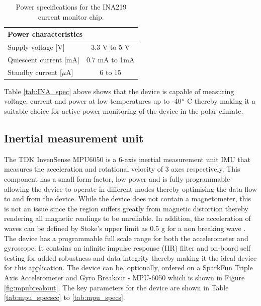 \begin{table}[H]
	\centering
	\caption{Power specifications for the INA219 current monitor chip.}
	\setlength{\extrarowheight}{5pt}
	\begin{tabular}{l c}
		\hline
		\multicolumn{2}{l}{\textbf{Power characteristics}}\\
		\hline
		\hline
		Supply voltage [V]  & 3.3 V to 5 V\\
		\hline
		Quiescent current [mA]  & 0.7 mA to 1mA\\
		\hline
		Standby current [$\mu$A] &6 to 15\\
		\hline
		\hline
	\end{tabular}
	
	\label{tab:INA_specpwr}
\end{table}

Table \ref{tab:INA_spec} above shows that the device is capable of measuring voltage, current and power at low temperatures up to -40$\degree$ C thereby making it a suitable choice for active power monitoring of the device in the polar climate.

\subsection{Inertial measurement unit}

The TDK InvenSense MPU6050\cite{mpu6050} is a 6-axis inertial measurement unit IMU that measures the acceleration and rotational velocity of 3 axes respectively. This component has a small form factor, low power and is fully programmable allowing the device to operate in different modes thereby optimising the data flow to and from the device. While the device does not contain a magnetometer, this is not an issue since the region suffers greatly from magnetic distortion \cite{kohout2015device} thereby rendering all magnetic readings to be unreliable. In addition, the acceleration of waves can be defined by Stoke's upper limit as 0.5 g for a non breaking wave  \cite{kohout2015device}. The device has a programmable full scale range for both the accelerometer and gyroscope. It contains an infinite impulse response (IIR) filter and on-board self testing for added robustness and data integrity thereby making it  the ideal device for this application. The device can be, optionally, ordered on a SparkFun Triple Axis Accelerometer and Gyro Breakout - MPU-6050 which is shown in Figure \ref{fig:mpubreakout}. The key parameters for the device are shown in Table \ref{tab:mpu_specscc} to \ref{tab:mpu_specs}.

